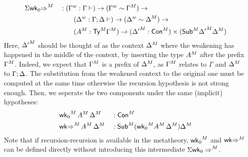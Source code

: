 \begin{alignat*}{5}
  & \model{\Sigma\wkO{\Rightarrow}}  && :
  (\wf{\Gamma} : \Gamma \vdash) \ra
  (\wf\Gamma \sim \model{\Gamma}) \ra
  \\
  & && \qquad
  (\wf{\Delta} : \Gamma\merge\Delta \vdash) \ra
  (\wf\Delta \sim \model{\Delta}) \ra
  \\ &&& \qquad
  (\model{A} : \model\Ty\model\Gamma)\ra
  (\model{\Delta'} : \model{\Con}) \times (\model{\Sub}\model{\Delta'}{\model{\Delta}})
\end{alignat*}
Here, $\model{\Delta'}$ should be thought of as the context $\model\Delta$ where
the weakening has happened in the middle of the context, by inserting the type
$\model{A}$ after the prefix $\model{\Gamma}$. Indeed, we expect that
$\model{\Gamma}$ is a prefix of $\model{\Delta}$, as $\model{\Gamma}$ relates to
$\Gamma$ and $\model{\Delta}$ to $\Gamma\merge\Delta$.
The substitution from the weakened context to the original one must
be computed at the same time otherwise the recursion hypothesis is not strong enough.
Then, we seperate the two components under the same (implicit) hypotheses:
\begin{alignat*}{5}
  & \model{\wkO}\,\model{A}\,\model\Delta  && :
   \model{\Con}
   \\
  & \model{\wk{\Rightarrow}}\,\model{A}\,\model\Delta  && :
   \model{\Sub}(\model{\wkO}\model{A}\,\model\Delta)\model\Delta
\end{alignat*}
Note that if recursion-recursion is available in the metatheory, $\model\wkO$
and $\wk\model{\Rightarrow}$ can be defined directly without introducing this
intermediate $\model{\Sigma\wkO\Rightarrow}$.


